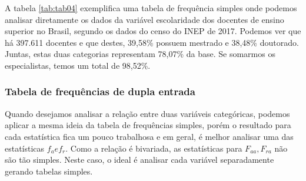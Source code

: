 \documentclass[12pt,]{style/krantz}
\makeatletter
\newenvironment{Shaded}{\begin{snugshade}}{\end{snugshade}}
\newcommand{\KeywordTok}[1]{\textcolor[rgb]{0.13,0.29,0.53}{\textbf{#1}}}
\newcommand{\DataTypeTok}[1]{\textcolor[rgb]{0.13,0.29,0.53}{#1}}
\newcommand{\DecValTok}[1]{\textcolor[rgb]{0.00,0.00,0.81}{#1}}
\newcommand{\StringTok}[1]{\textcolor[rgb]{0.31,0.60,0.02}{#1}}
\newcommand{\OtherTok}[1]{\textcolor[rgb]{0.56,0.35,0.01}{#1}}
\newcommand{\OperatorTok}[1]{\textcolor[rgb]{0.81,0.36,0.00}{\textbf{#1}}}
\newcommand{\NormalTok}[1]{#1}
\newenvironment{kframe}{%
\medskip{}
\setlength{\fboxsep}{.8em}
 \def\at@end@of@kframe{}%
 \ifinner\ifhmode%
  \def\at@end@of@kframe{\end{minipage}}%
  \begin{minipage}{\columnwidth}%
 \fi\fi%
 \def\FrameCommand##1{\hskip\@totalleftmargin \hskip-\fboxsep
 \colorbox{shadecolor}{##1}\hskip-\fboxsep
     \hskip-\linewidth \hskip-\@totalleftmargin \hskip\columnwidth}%
 \MakeFramed {\advance\hsize-\width
   \@totalleftmargin\z@ \linewidth\hsize
   \@setminipage}}%
 {\par\unskip\endMakeFramed%
 \at@end@of@kframe}
\renewenvironment{Shaded}{\begin{kframe}}{\end{kframe}}
\theoremstyle{definition}
\theoremstyle{definition}
\theoremstyle{definition}
\theoremstyle{remark}
\makeatother
\begin{document}
A tabela \ref{tab:tab04} exemplifica uma tabela de frequência simples
onde podemos analisar diretamente os dados da variável escolaridade dos
docentes de ensino superior no Brasil, segundo os dados do censo do INEP
de 2017. Podemos ver que há 397.611 docentes e que destes, 39,58\%
possuem mestrado e 38,48\% doutorado. Juntas, estas duas categorias
representam 78,07\% da base. Se somarmos os especialistas, temos um
total de 98,52\%.

\subsubsection{Tabela de frequências de dupla
entrada}\label{tabela-de-frequencias-de-dupla-entrada}

Quando desejamos analisar a relação entre duas variáveis categóricas,
podemos aplicar a mesma ideia da tabela de frequências simples, porém o
resultado para cada estatística fica um pouco trabalhosa e em geral, é
melhor analisar uma das estatísticas \(f_{a} e f_{r}\). Como a relação é
bivariada, as estatísticas para \(F_{aa}, F_{ra}\) não são tão simples.
Neste caso, o ideal é analisar cada variável separadamente gerando
tabelas simples.

\begin{Shaded}
\end{Shaded}
\end{document}
